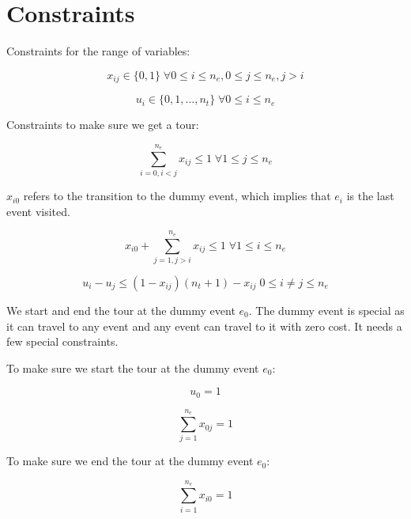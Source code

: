 \documentclass[11pt]{article}
\begin{document}
\section{Constraints}
Constraints for the range of variables:

\begin{equation} \label{constr:x}
    x_{ij} \in \{0, 1\} \; \forall 0 \leq i \leq n_e, 0 \leq j \leq n_e, j > i
\end{equation}

\begin{equation} \label{constr:u}
    u_i \in \{0, 1, \ldots, n_t\} \; \forall 0 \leq i \leq n_e
\end{equation}

Constraints to make sure we get a tour:

\begin{equation} \label{constr:in_edge}
    \sum_{i=0, i < j}^{n_e} x_{ij} \leq 1 \; \forall 1 \leq j \leq n_e
\end{equation}

$x_{i0}$ refers to the transition to the dummy event, which implies that $e_i$ is the last event visited.

\begin{equation} \label{constr:out_edge}
    x_{i0} + \sum_{j=1, j > i}^{n_e} x_{ij} \leq 1 \; \forall 1 \leq i \leq n_e
\end{equation}

\begin{equation} \label{constr:order}
    u_i - u_j \leq (1 - x_{ij})(n_t + 1) - x_{ij} \; 0 \leq i \neq j \leq n_e
\end{equation}

We start and end the tour at the dummy event $e_0$. The dummy event is special as it can travel to any event and any event can travel to it with zero cost. It needs a few special constraints.

To make sure we start the tour at the dummy event $e_0$:

\begin{equation} \label{constr:start}
    u_0 = 1
\end{equation}

\begin{equation} \label{constr:start_out_edge}
    \sum_{j=1}^{n_e} x_{0j} = 1
\end{equation}

To make sure we end the tour at the dummy event $e_0$:

\begin{equation} \label{constr:end}
    \sum_{i=1}^{n_e} x_{i0} = 1
\end{equation}
\end{document}
